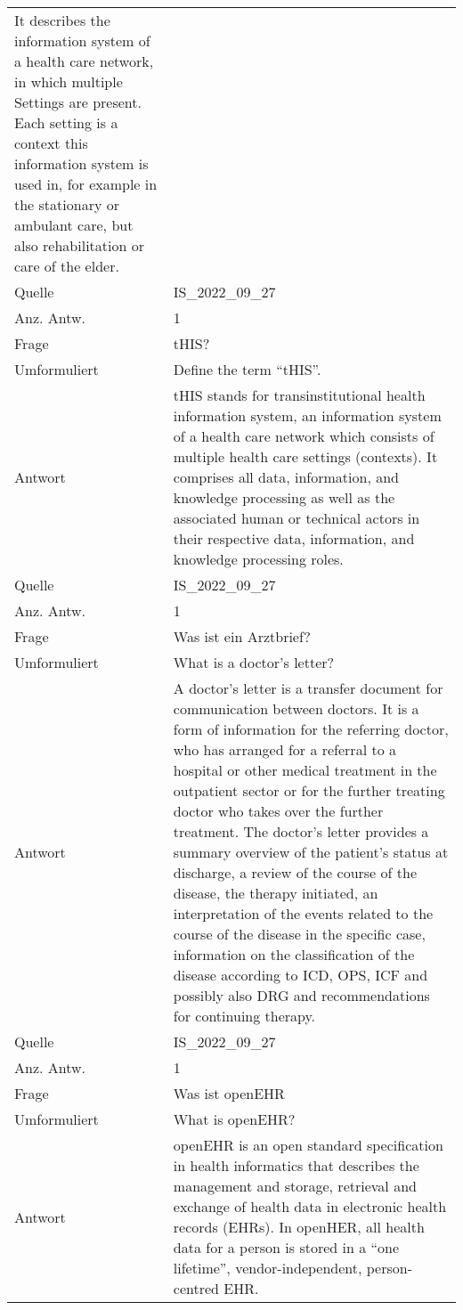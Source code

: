 \begin{landscape}
\begin{longtable}{p{3cm}p{}}
    It describes the information system of a health care network, in which multiple Settings are present.
    Each setting is a context this information system is used in, for example in the stationary or ambulant care, but also rehabilitation or care of the elder.\\
    Quelle & IS\_2022\_09\_27 \\
    Anz. Antw.& 1 \\
    \midrule
    Frage & tHIS? \\
    Umformuliert & Define the term ``tHIS''. \\
    Antwort & tHIS stands for transinstitutional health information system, an information system of a health care network which consists of multiple health care settings (contexts). It comprises all data, information, and knowledge processing as well as the associated human or technical actors in their respective data, information, and knowledge processing roles.\\
    Quelle & IS\_2022\_09\_27 \\
    Anz. Antw.& 1 \\
    \midrule
    Frage & Was ist ein Arztbrief? \\
    Umformuliert & What is a doctor's letter? \\
    Antwort & A doctor's letter is a transfer document for communication between doctors.
    It is a form of information for the referring doctor, who has arranged for a referral to a hospital or other medical treatment in the outpatient sector or for the further treating doctor who takes over the further treatment.
    The doctor's letter provides a summary overview of the patient's status at discharge, a review of the course of the disease, the therapy initiated, an interpretation of the events related to the course of the disease in the specific case, information on the classification of the disease according to ICD, OPS, ICF and possibly also DRG and recommendations for continuing therapy.\\
    Quelle & IS\_2022\_09\_27 \\
    Anz. Antw.& 1 \\
    \midrule
    Frage & Was ist openEHR \\
    Umformuliert & What is openEHR? \\
    Antwort & openEHR is an open standard specification in health informatics that describes the management and storage, retrieval and exchange of health data in electronic health records (EHRs). In openHER, all health data for a person is stored in a ``one lifetime'', vendor-independent, person-centred EHR.

\end{longtable}
\end{landscape}
